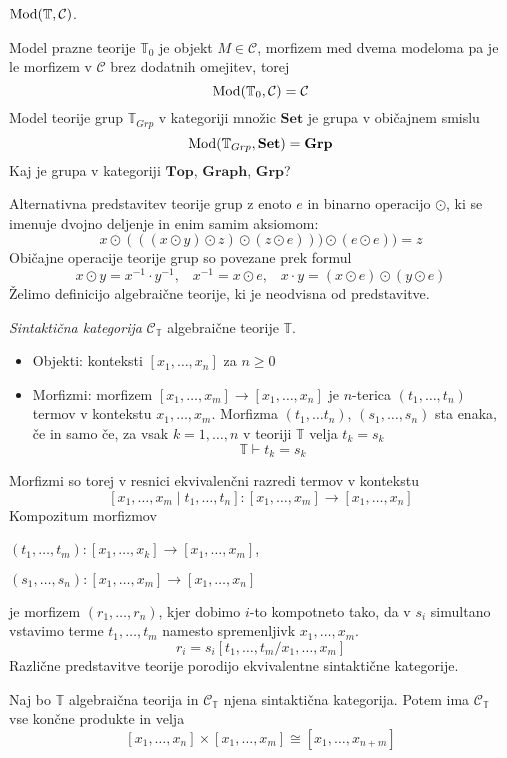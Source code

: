 \documentclass[../kategoricna_logika.tex]{subfiles}
\begin{document}
$\operatorname{Mod}(\mathbb{T}, \mathcal{C})$.
%
\begin{primer}
  Model prazne teorije $\mathbb{T}_0$ je objekt $M \in \mathcal{C}$,
  morfizem med dvema modeloma pa je le morfizem v $\mathcal{C}$ brez
  dodatnih omejitev, torej
$$\operatorname{Mod}(\mathbb{T}_0, \mathcal{C}) = \mathcal{C}$$
%
Model teorije grup $\mathbb{T}_{Grp}$ v kategoriji množic
$\mathbf{Set}$ je grupa v običajnem smislu
$$\operatorname{Mod}(\mathbb{T}_{Grp}, \mathbf{Set}) = \mathbf{Grp}$$
%
Kaj je grupa v kategoriji $\mathbf{Top}$, $\mathbf{Graph}$,
$\mathbf{Grp}$?
\end{primer}
%
Alternativna predstavitev teorije grup z enoto $e$ in binarno
operacijo $\odot$, ki se imenuje dvojno deljenje in enim samim
aksiomom:
$$x \odot (((x \odot y ) \odot z ) \odot ( z \odot e))) \odot (e \odot e) ) = z$$
Običajne operacije teorije grup so povezane prek formul
$$x \odot y = x^{-1} \cdot y^{-1} \text{,} \quad x^{-1} = x \odot e \text{,} \quad x \cdot y = (x \odot e) \odot (y \odot e)$$
%
Želimo definicijo algebraične teorije, ki je neodvisna od
predstavitve.
%
\begin{definicija}
  \emph{Sintaktična kategorija} $\mathcal{C}_\mathbb{T}$ algebraične
  teorije $\mathbb{T}$.
%
  \begin{itemize}
  \item Objekti: konteksti $[x_1, \ldots, x_n]$ za $n \geq 0$
%
  \item Morfizmi: morfizem $[x_1, \ldots, x_m] \to [x_1, \ldots, x_n]$
    je $n$-terica $(t_1, \ldots, t_n)$ termov v kontekstu
    $x_1, \ldots, x_m$. Morfizma $(t_1, \ldots t_n)$,
    $(s_1, \ldots, s_n)$ sta enaka, če in samo če, za vsak
    $k = 1, \ldots, n$ v teoriji $\mathbb{T}$ velja $t_k = s_k$
$$\mathbb{T} \vdash t_k = s_k$$
\end{itemize}
\end{definicija}
%
Morfizmi so torej v resnici ekvivalenčni razredi termov v kontekstu
$$[x_1, \ldots, x_m \mid t_1, \ldots, t_n] : [x_1, \ldots, x_m] \to [x_1, \ldots, x_n]$$
%
Kompozitum morfizmov
\begin{center}
  \begin{description}
  \item
    $(t_1, \ldots, t_m) : [x_1, \ldots, x_k] \to [x_1, \ldots, x_m]$,
  \item
    $(s_1, \ldots, s_n) : [x_1, \ldots, x_m] \to [x_1, \ldots, x_n]$
  \end{description}
\end{center}
je morfizem $(r_1, \ldots, r_n)$, kjer dobimo $i$-to kompotneto tako,
da v $s_i$ simultano vstavimo terme $t_1, \ldots, t_m$ namesto
spremenljivk $x_1, \ldots, x_m$.
$$r_i = s_i[t_1, \ldots, t_m / x_1, \ldots, x_m]$$
%
Različne predstavitve teorije porodijo ekvivalentne sintaktične
kategorije.
%
\begin{lema}
  Naj bo $\mathbb{T}$ algebraična teorija in $\mathcal{C}_\mathbb{T}$
  njena sintaktična kategorija. Potem ima $\mathcal{C}_\mathbb{T}$ vse
  končne produkte in velja
$$[x_1, \ldots, x_n] \times [x_1, \ldots, x_m] \cong [x_1, \ldots, x_{n+m}]$$
\end{lema}
%
%
\end{document}
